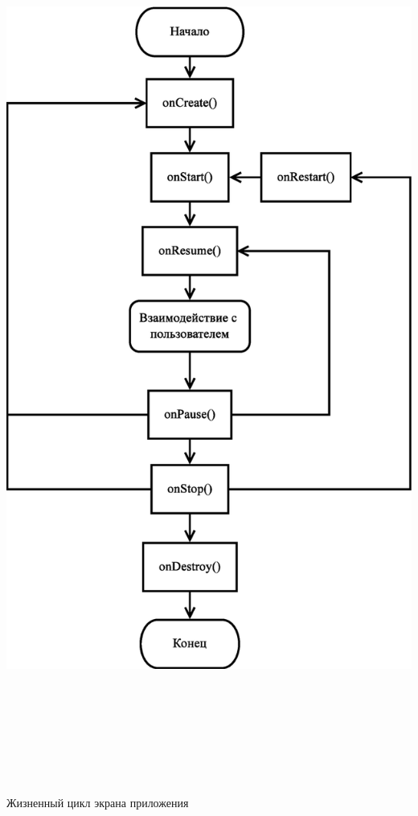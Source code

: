 \documentclass[russian,utf8,a1paper,nostitching,simple]{eskdgraph}
\begin{document}
\begin{ESKDdrawing}
\begin{minipage}{0.25\linewidth}
    \vspace{4cm}
    \centering
    \includegraphics[height=30cm]{fig/implementation_ui_lifecycle_activity.eps}

    \vspace{2cm}
    {\Huge{Жизненный цикл экрана приложения}}
  \end{minipage}
\end{ESKDdrawing}

\setcounter{page}{1}
\begin{ESKDdrawing}
\end{ESKDdrawing}
\end{document}
